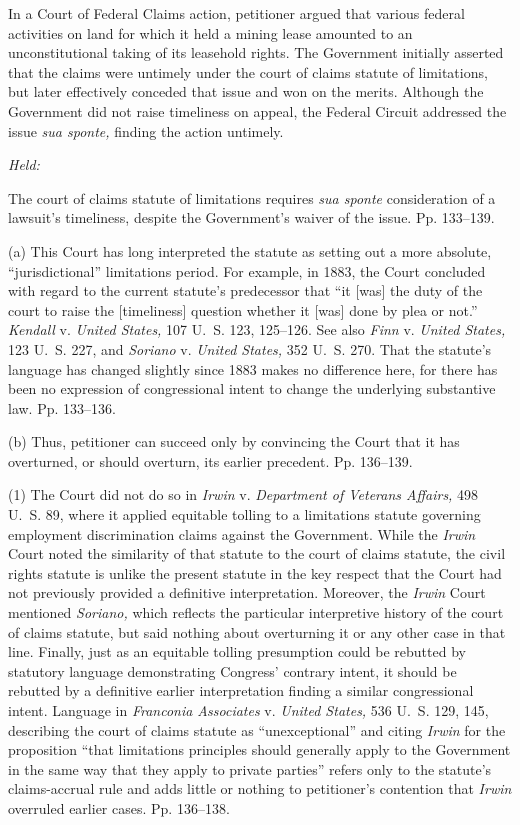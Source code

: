 
\setcounter{page}{130}

  In a Court of Federal Claims action, petitioner argued that various federal activities on land for which it held a mining lease amounted to an unconstitutional taking of its leasehold rights. The Government initially asserted that the claims were untimely under the court of claims statute of limitations, but later effectively conceded that issue and won on the merits. Although the Government did not raise timeliness on appeal, the Federal Circuit addressed the issue \emph{sua sponte,} finding the action untimely.

\emph{Held:}

  The court of claims statute of limitations requires \emph{sua sponte} consideration of a lawsuit's timeliness, despite the Government's waiver of the issue. Pp. 133--139.

  (a) This Court has long interpreted the statute as setting out a more absolute, ``jurisdictional'' limitations period. For example, in 1883, the Court concluded with regard to the current statute's predecessor that ``it [was] the duty of the court to raise the [timeliness] question whether it [was] done by plea or not.'' \emph{Kendall} v. \emph{United States,} 107 U.~S. 123, 125--126. See also \emph{Finn} v. \emph{United States,} 123 U.~S. 227, and \emph{Soriano} v. \emph{United States,} 352 U.~S. 270. That the statute's language has changed slightly since 1883 makes no difference here, for there has been no expression of congressional intent to change the underlying substantive law. Pp. 133--136.

  (b) Thus, petitioner can succeed only by convincing the Court that it has overturned, or should overturn, its earlier precedent. Pp. 136--139.

  (1) The Court did not do so in \emph{Irwin} v. \emph{Department of Veterans Affairs,} 498 U.~S. 89, where it applied equitable tolling to a limitations statute governing employment discrimination claims against the Government. While the \emph{Irwin} Court noted the similarity of that statute to the court of claims statute, the civil rights statute is unlike the present statute in the key respect that the Court had not previously provided a definitive interpretation. Moreover, the \emph{Irwin} Court mentioned \emph{Soriano,} which reflects the particular interpretive history of the court of claims statute, but said nothing about overturning it or any other case in that line. Finally, just as an equitable tolling presumption \newpage  could be rebutted by statutory language demonstrating Congress' contrary intent, it should be rebutted by a definitive earlier interpretation finding a similar congressional intent. Language in \emph{Franconia Associates} v. \emph{United States,} 536 U.~S. 129, 145, describing the court of claims statute as ``unexceptional'' and citing \emph{Irwin} for the proposition ``that limitations principles should generally apply to the Government in the same way that they apply to private parties'' refers only to the statute's claims-accrual rule and adds little or nothing to petitioner's contention that \emph{Irwin} overruled earlier cases. Pp. 136--138.

